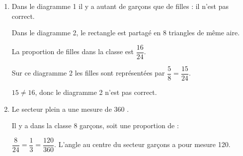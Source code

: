 
%

\medskip

\begin{enumerate}
\item %
Dans le diagramme 1 il y a autant de garçons que de filles : il n'est pas correct.

Dans le diagramme 2, le rectangle est partagé en 8 triangles de même aire.

La proportion de filles dans la classe est $\dfrac{16}{24}$.

Sur ce diagramme 2 les filles sont représentées par $\dfrac{5}{8} = \dfrac{15}{24}$.

$15\ne 16$, donc le diagramme 2 n'est pas correct.
\item %

%
Le secteur plein a une mesure de 360 \degres.

Il y a dans la classe 8 garçons, soit une proportion de :

$\dfrac{8}{24} = \dfrac{1}{3} =  \dfrac{120}{360}$. L'angle au centre du secteur garçons a pour mesure 120\degres.
\end{enumerate}

\vspace{0,5cm}


